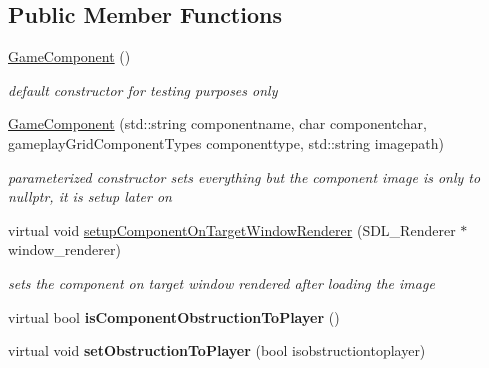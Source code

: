 \subsection*{Public Member Functions}
\begin{DoxyCompactItemize}
\item 
\hypertarget{class_game_component_a7109f4539ef3d4e92868298df54b7ecd}{}\label{class_game_component_a7109f4539ef3d4e92868298df54b7ecd} 
\hyperlink{class_game_component_a7109f4539ef3d4e92868298df54b7ecd}{Game\+Component} ()
\begin{DoxyCompactList}\small\item\em default constructor for testing purposes only \end{DoxyCompactList}\item 
\hypertarget{class_game_component_a5630b64813389d5e388e29de890df394}{}\label{class_game_component_a5630b64813389d5e388e29de890df394} 
\hyperlink{class_game_component_a5630b64813389d5e388e29de890df394}{Game\+Component} (std\+::string componentname, char componentchar, gameplay\+Grid\+Component\+Types componenttype, std\+::string imagepath)
\begin{DoxyCompactList}\small\item\em parameterized constructor sets everything but the component image is only to nullptr, it is setup later on \end{DoxyCompactList}\item 
\hypertarget{class_game_component_aafbdc5c3c60fad5e75e118904964c676}{}\label{class_game_component_aafbdc5c3c60fad5e75e118904964c676} 
virtual void \hyperlink{class_game_component_aafbdc5c3c60fad5e75e118904964c676}{setup\+Component\+On\+Target\+Window\+Renderer} (S\+D\+L\+\_\+\+Renderer $\ast$window\+\_\+renderer)
\begin{DoxyCompactList}\small\item\em sets the component on target window rendered after loading the image \end{DoxyCompactList}\item 
\hypertarget{class_game_component_a7c0910c67b460d696d5877f3b665249c}{}\label{class_game_component_a7c0910c67b460d696d5877f3b665249c} 
virtual bool {\bfseries is\+Component\+Obstruction\+To\+Player} ()
\item 
\hypertarget{class_game_component_a9eb14b8657149e56eea9584c1090457b}{}\label{class_game_component_a9eb14b8657149e56eea9584c1090457b} 
virtual void {\bfseries set\+Obstruction\+To\+Player} (bool isobstructiontoplayer)
\item 

\end{DoxyCompactItemize}

